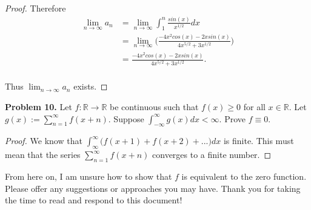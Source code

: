 \documentclass[12pt]{article}
\begin{document}
\begin{flushleft}
\begin{proof}
Therefore \begin{align*}
\lim_{n \to \infty} a_{n} &= \lim_{n \to \infty} \int_{1}^{n} \frac{sin(x)}{x^{1/2}}dx \\
				  &= \lim_{n \to \infty} \big( \frac{-4x^{2}cos(x)-2xsin(x)}{4x^{5/2}+3x^{1/2}} \big) \\
				  &=\frac{-4x^{2}cos(x)-2xsin(x)}{4x^{5/2}+3x^{1/2}}. \\
\end{align*}

Thus $\lim_{n \to \infty} a_{n}$ exists. 	    
\end{proof}

\vspace{.2cm}

\textbf{Problem 10.} Let $f: \mathbb{R} \rightarrow \mathbb{R}$ be continuous such that $f(x)\geq 0$ for all $x \in \mathbb{R}$. Let $g(x):= \sum_{n=1}^{\infty} f(x+n)$. Suppose
$\int_{-\infty}^{\infty} g(x)dx< \infty$. Prove $f \equiv 0$. 

\vspace{.2cm}

\begin{proof}

We know that $\int_{\infty}^{\infty} \big( f(x+1)+f(x+2)+...\big)dx$ is finite. This must mean that the series $\sum_{n=1}^{\infty} f(x+n)$ converges to a finite number.

\end{proof}

\color{red} From here on, I am unsure how to show that $f$ is equivalent to the zero function. Please offer any suggestions or approaches you may have. Thank you for taking the time to read and respond to this document!

\end{flushleft}
\end{document}
